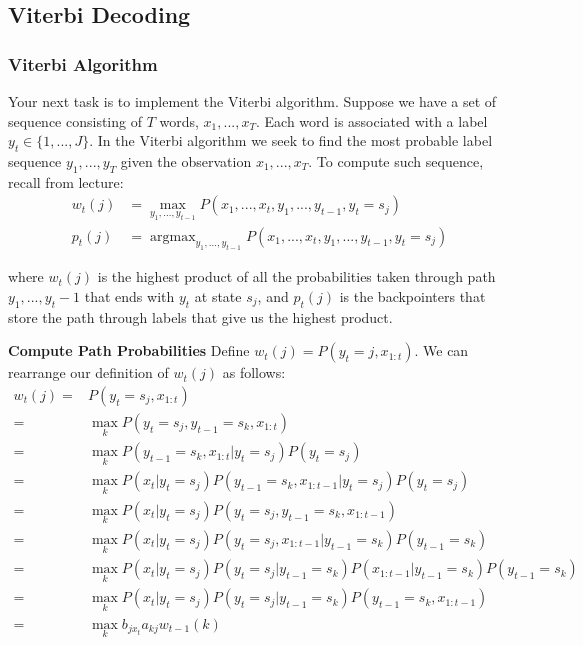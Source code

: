 \documentclass{article}
\newcommand{\argmax}{\mathop{\mathrm{argmax}}}
\begin{document}

\subsection{Viterbi Decoding}
\label{viterbi}

\subsubsection{Viterbi Algorithm}

Your next task is to implement the Viterbi algorithm. Suppose we have a set of sequence consisting of $T$ words, $x_1,...,x_T$. Each word is associated with a label $y_t\in\{1,...,J\}$. In the Viterbi algorithm we seek to find the most probable label sequence $y_1, ..., y_T$ given the observation $x_1,...,x_T$. To compute such sequence, recall from lecture: 
\begin{align*}
    w_t(j) &= \max_{y_1,...,y_{t-1}} P(x_1, ..., x_t, y_1, ..., y_{t-1}, y_t=s_j)\\ 
    p_t(j) &= \argmax_{y_1,...,y_{t-1}} P(x_1, ..., x_t, y_1, ..., y_{t-1}, y_t=s_j)
\end{align*}

where $w_t(j)$ is the highest product of all the probabilities taken through path $y_1, ..., y_t-1$ that ends with $y_t$ at state $s_j$, and $p_t(j)$ is the backpointers that store the path through labels that give us the highest product.

\textbf{Compute Path Probabilities}
Define $w_t(j) = P(y_t = j, x_{1:t})$. We can rearrange our definition of $w_t(j)$ as follows:
\begin{align*}
    w_t(j)
    =&P(y_t=s_j, x_{1:t}) \\
    =& \max_{k} P(y_t=s_j, y_{t-1}=s_k, x_{1:t}) \\
    =& \max_{k} P(y_{t-1}=s_k, x_{1:t} \vert y_t = s_j) P(y_t = s_j) \\
    =& \max_{k} P(x_t \vert y_t = s_j) P(y_{t-1}=s_k, x_{1:t-1} \vert y_t = s_j) P(y_t = s_j) \\
    =& \max_{k} P(x_t \vert y_t = s_j) P(y_t = s_j, y_{t-1}=s_k, x_{1:t-1}) \\
    =& \max_{k} P(x_t \vert y_t = s_j) P(y_t = s_j, x_{1:t-1} \vert y_{t-1}=s_k) P(y_{t-1}=s_k) \\
    =& \max_{k} P(x_t \vert y_t = s_j) P(y_t = s_j \vert y_{t-1}=s_k) P(x_{1:t-1} \vert y_{t-1}=s_k) P(y_{t-1}=s_k) \\
    =& \max_{k} P(x_t \vert y_t = s_j) P(y_t = s_j \vert y_{t-1}=s_k) P(y_{t-1}=s_k, x_{1:t-1}) \\
    =& \max_{k} b_{jx_t} a_{kj} w_{t-1}(k) \\
\end{align*}
\end{document}
